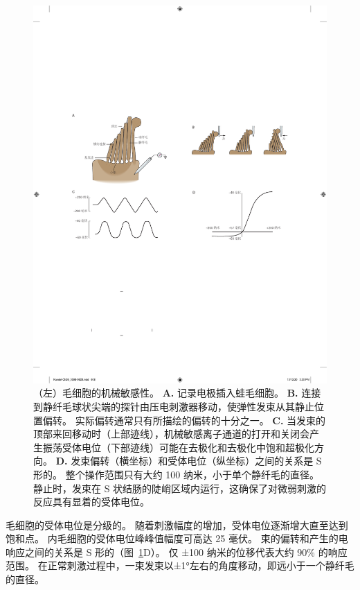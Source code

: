 \begin{figure}[htbp]
	\centering
	\includegraphics[width=1.0\linewidth]{chap26/fig_26_7}
	\caption{（左）毛细胞的机械敏感性。
		\textbf{A.} 记录电极插入蛙毛细胞。
		\textbf{B.} 连接到静纤毛球状尖端的探针由压电刺激器移动，使弹性发束从其静止位置偏转。
		实际偏转通常只有所描绘的偏转的十分之一。
		\textbf{C.} 当发束的顶部来回移动时（上部迹线），机械敏感离子通道的打开和关闭会产生振荡受体电位（下部迹线）可能在去极化和去极化中饱和超极化方向。
		\textbf{D.} 发束偏转（横坐标）和受体电位（纵坐标）之间的关系是 S 形的。
		整个操作范围只有大约 100 纳米，小于单个静纤毛的直径。
		静止时，发束在 S 状结肠的陡峭区域内运行，这确保了对微弱刺激的反应具有显着的受体电位。}
	\label{fig:26_7}
\end{figure}


毛细胞的受体电位是分级的。
随着刺激幅度的增加，受体电位逐渐增大直至达到饱和点。
内毛细胞的受体电位峰峰值幅度可高达 25 毫伏。
束的偏转和产生的电响应之间的关系是 S 形的（图~\ref{fig:26_7}D）。
仅 ±100 纳米的位移代表大约 90\% 的响应范围。
在正常刺激过程中，一束发束以±1°左右的角度移动，即远小于一个静纤毛的直径。


